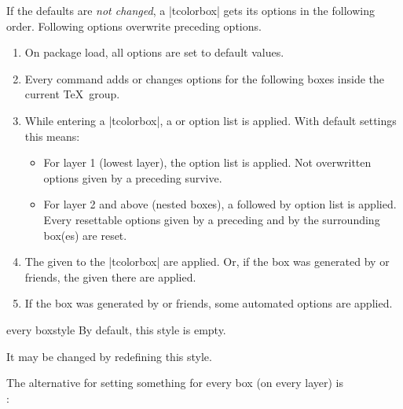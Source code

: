 If the defaults are \emph{not changed}, a |tcolorbox| gets its options
in the following order. Following options overwrite preceding options.
\begin{enumerate}
\item On package load, all options are set to default values.
\item Every  command adds or changes options for the following boxes
  inside the current \TeX\ group.
\item While entering a |tcolorbox|, a  or
   option list is applied.
  With default settings this means:
  \begin{itemize}
  \item For layer 1 (lowest layer), the  option list is applied.
    Not overwritten options given by a preceding  survive.
  \item For layer 2 and above (nested boxes), a  followed by
     option list is applied.
    Every resettable options given by a preceding 
    and by the surrounding box(es) are reset.
  \end{itemize}
\item The  given to the |tcolorbox| are applied.
  Or, if the box was generated by  or friends,
  the  given there are applied.
\item If the box was generated by  or friends,
  some automated options are applied.
\end{enumerate}


\begin{docTcbKey}{every box}{}{style}
By default, this style is empty.
\begin{dispListing}
\end{dispListing}
It may be changed by redefining this style.
\begin{dispListing}
\end{dispListing}

\medskip
\begin{marker}
The alternative for setting something for every box (on every layer) is\\
:
\begin{dispListing}
\end{dispListing}
\end{marker}
\end{docTcbKey}

